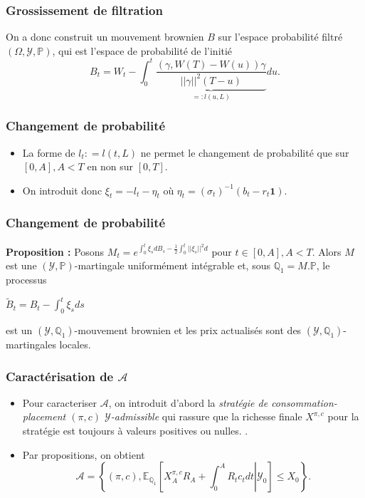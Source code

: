 \documentclass{beamer}
\begin{document}
\begin{frame}
\frametitle{Grossissement de filtration}

On a donc construit un mouvement brownien $B$ sur l'espace probabilité filtré $(\Omega, \mathcal{Y}, \mathbb{P})$, qui est l'espace de probabilité de l'initié
\begin{equation*}
B_t = W_t - \displaystyle \int_{0}^{t} \underbrace{\frac{\left( \gamma, W \left( T \right) - W \left( u \right) \right) \gamma}{||\gamma||^2 \left( T - u \right)} }_{=:l(u, L)} du.
\end{equation*}

\end{frame}

\begin{frame}
\frametitle{Changement de probabilité}
\begin{itemize}
\item La forme de $l_t : = l(t, L)$ ne permet le changement de probabilité que sur $[0, A], A<T$ en non sur $[0, T]$. 
\item On introduit donc $\xi_t = -l_t - \eta_t$ où $\eta_t = (\sigma_t)^{-1} (b_t - r_t \textbf{1})$.
\end{itemize}

\end{frame}

\begin{frame}
\frametitle{Changement de probabilité}
\textbf{Proposition : } Posons $M_t = e^{ \int_{0}^{t} \xi_s dB_s - \frac{1}{2} \int_{0}^{t} ||\xi_s||^2 d}$ pour $t \in [0,A] , A<T$. Alors $M$ est une $(
\mathcal{Y}, \mathbb{P})$-martingale uniformément intégrable et, sous $\mathbb{Q}_1 = M.\mathbb{P}$, le processus
\begin{center}
 $\tilde{B}_t = B_t - \displaystyle \int_{0}^{t}\xi_s ds$
 \end{center}
 est un $(\mathcal{Y}, \mathbb{Q}_1)$-mouvement brownien et les prix actualisés sont des $(\mathcal{Y}, \mathbb{Q}_1)$-martingales locales.
\end{frame}

\begin{frame}
\frametitle{Caractérisation de $\mathcal{A}$}
\begin{itemize}
\item Pour caracteriser $\mathcal{A}$, on introduit d'abord la \textit{stratégie de consommation-placement $(\pi, c)$ $ \mathcal{Y}$-admissible} qui rassure que la richesse finale $X^{\pi, c}$ pour la stratégie est toujours à valeurs positives ou nulles. .
\item Par propositions, on obtient 
\begin{equation*}
\mathcal{A} = \left\lbrace \left( \pi, c \right), \mathbb{E}_{\mathbb{Q}_1} \left[ X_A^{\pi, c} R_A + \int_0^A R_t c_t dt \left\vert\right. \mathcal{Y}_0 \right] \leq X_0 \right\rbrace .
\end{equation*}
\end{itemize}
\end{frame}
\end{document}
